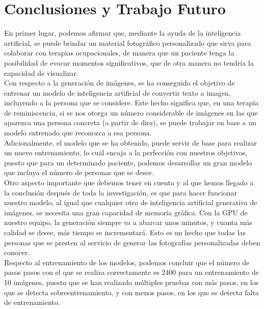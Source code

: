 \chapter{Conclusiones y Trabajo Futuro}
\label{cap:conclusiones}

En primer lugar, podemos afirmar que, mediante la ayuda de la inteligencia artificial, se puede brindar un material fotográfico personalizado que sirva para colaborar con terapias ocupacionales, de manera que un paciente tenga la posibilidad de evocar momentos significativos, que de otra manera no tendría la capacidad de visualizar.\\

Con respecto a la generación de imágenes, se ha conseguido el objetivo de entrenar un modelo de inteligencia artificial de convertir texto a imagen, incluyendo a la persona que se considere. Este hecho significa que, en una terapia de reminiscencia, si se nos otorga un número considerable de imágenes en las que aparezca una persona concreta (a partir de diez), se puede trabajar en base a un modelo entrenado que reconozca a esa persona.\\
 
Adicionalmente, el modelo que se ha obtenido, puede servir de base para realizar un nuevo entrenamiento, lo cuál encaja a la perfección con nuestros objetivos, puesto que para un determinado paciente, podemos desarrollar un gran modelo que incluya el número de personas que se desee. \\

Otro aspecto importante que debemos tener en cuenta y al que hemos llegado a la conclusión después de toda la investigación, es que para hacer funcionar nuestro modelo, al igual que cualquier otro de inteligencia artificial generativa de imágenes, se necesita una gran capacidad de memoria gráfica. Con la GPU de nuestro equipo, la generación siempre va a abarcar unos minutos, y cuanta más calidad se desee, más tiempo se incrementará. Esto es un hecho que todas las personas que se presten al servicio de generar las fotografías personalizadas deben conocer.\\

Respecto al entrenamiento de los modelos, podemos concluir que el número de pasos pasos con el que se realiza correctamente es 2400 para un entrenamiento de 10 imágenes, puesto que se han realizado múltiples pruebas con más pasos, en los que se detecta sobreentrenamiento, y con menos pasos, en los que se detecta falta de entrenamiento.\\

